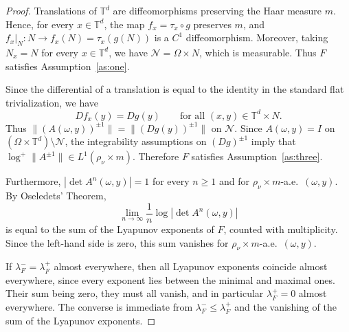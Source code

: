 \documentclass[a4paper,12pt,reqno]{amsart}
\numberwithin{equation}{section}
\newtheorem{remark}[theorem]{Remark}
\newcommand{\cal}{\mathcal}
\newcommand{\NN}{{\cal N}}
\newcommand{\Tt}{{\mathbb{T}}}
\def\SL{\operatorname{SL}}
\begin{document}
\begin{proof}
Translations of $\Tt^d$ are diffeomorphisms preserving the Haar measure $m$. Hence, for every $x\in\Tt^d$, the map $f_x=\tau_x\circ g$ preserves $m$, and $f_x|_N\colon N\to f_x(N)=\tau_x(g(N))$ is a $C^1$ diffeomorphism. Moreover, taking $N_x=N$ for every $x\in\Tt^d$, we have
$\NN=\Omega\times N$, which is measurable. Thus $F$ satisfies Assumption~\ref{as:one}.

Since the differential of a translation is equal to the identity in the standard flat trivialization, we have 
\[
Df_x(y)=Dg(y) \qquad \text{for all } (x,y) \in\Tt^d \times N.
\]
Thus $\|(A(\omega,y))^{\pm 1}\|=\|(Dg(y))^{\pm 1}\|$ on $\NN$. Since $A(\omega,y)=I$ on $(\Omega \times \Tt^d) \setminus \NN$, the integrability assumptions on $(Dg)^{\pm 1}$ imply that $\log^+ \|A^{\pm 1}\| \in L^{1}(\rho_{\nu} \times m)$. Therefore $F$ satisfies Assumption~\ref{as:three}.


Furthermore, $|\det A^n(\omega,y)|=1$
for every $n\geq1$ and for $\rho_\nu\times m$-a.e.\ $(\omega,y)$. By Oseledets' Theorem,
\[
\lim_{n\to\infty}\frac1n\log|\det A^n(\omega,y)|
\]
is equal to the sum of the Lyapunov exponents of $F$, counted with multiplicity. Since the left-hand side is zero, this sum vanishes for $\rho_\nu\times m$-a.e.\ $(\omega,y)$.

If $\lambda_F^-=\lambda_F^+$ almost everywhere, then all Lyapunov exponents coincide almost everywhere, since every exponent lies between the minimal
and maximal ones. Their sum being zero, they must all vanish, and in particular $\lambda_F^+=0$ almost everywhere. The converse is immediate
from $\lambda_F^- \le \lambda_F^+$ and the vanishing of the sum of the Lyapunov exponents.
\end{proof}



\end{document}
